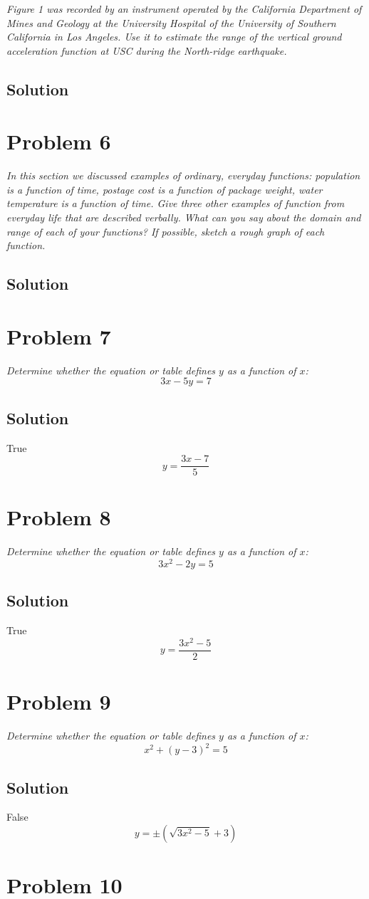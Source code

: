 \documentclass[11pt]{article}
\newcommand{\soln}{\subsection*}
\newcommand{\qn}{\textit}
\begin{document}
\qn{Figure 1 was recorded by an instrument operated by the California Department of Mines and Geology at the University Hospital of the University of Southern California in Los Angeles. Use it to estimate the range of the vertical ground acceleration function at USC during the North-ridge earthquake.}

\soln{Solution}

\section*{Problem 6}

\qn{In this section we discussed examples of ordinary, everyday functions: population is a function of time, postage cost is a function of package weight, water temperature is a function of time. Give three other examples of function from everyday life that are described verbally. What can you say about the domain and range of each of your functions? If possible, sketch a rough graph of each function.}

\soln{Solution}

\section*{Problem 7}

\qn{Determine whether the equation or table defines $y$ as a function of $x$: $$3x-5y=7$$}

\soln{Solution}
True
$$y=\frac{3x-7}{5}$$

\section*{Problem 8}

\qn{Determine whether the equation or table defines $y$ as a function of $x$: $$3x^2-2y=5$$}

\soln{Solution}
True
$$y=\frac{3x^2-5}{2}$$

\section*{Problem 9}

\qn{Determine whether the equation or table defines $y$ as a function of $x$: $$x^2+(y-3)^2=5$$}

\soln{Solution}
False
$$y=\pm(\sqrt{3x^2-5}+3)$$

\section*{Problem 10}
\end{document}
